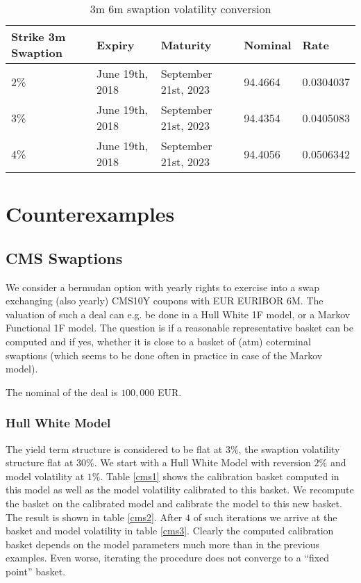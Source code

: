 \documentclass{amsart}
\theoremstyle{plain}
\numberwithin{equation}{section}
\begin{document}
\begin{table}[ht]
\caption{3m 6m swaption volatility conversion}
\begin{tabular}{l | l | l | l | l}
Strike 3m Swaption & Expiry & Maturity & Nominal & Rate \\ \hline
2\% & June 19th, 2018 & September 21st, 2023 & 94.4664 & 0.0304037 \\
3\% & June 19th, 2018 & September 21st, 2023 & 94.4354 & 0.0405083 \\
4\% & June 19th, 2018 & September 21st, 2023 & 94.4056 & 0.0506342
\end{tabular}
\label{tenorSwaptions}
\end{table}

\section{Counterexamples}

\subsection{CMS Swaptions}

We consider a bermudan option with yearly rights to exercise into a swap exchanging (also yearly) CMS10Y coupons with EUR EURIBOR 6M. The valuation of such a deal can e.g. be done in a Hull White 1F model, or a Markov Functional 1F model. The question is if a reasonable representative basket can be computed and if yes, whether it is close to a basket of (atm) coterminal swaptions (which seems to be done often in practice in case of the Markov model).

The nominal of the deal is $100,000$ EUR.


\subsubsection{Hull White Model}

The yield term structure is considered to be flat at $3\%$, the swaption volatility structure flat at $30\%$. We start with a Hull White Model with reversion $2\%$ and model volatility at $1\%$. Table \ref{cms1} shows the calibration basket computed in this model as well as the model volatility calibrated to this basket. We recompute the basket on the calibrated model and calibrate the model to this new basket. The result is shown in table \ref{cms2}. After $4$ of such iterations we arrive at the basket and model volatility in table \ref{cms3}. Clearly the computed calibration basket depends on the model parameters much more than in the previous examples. Even worse, iterating the procedure does not converge to a ``fixed point'' basket.
\end{document}
